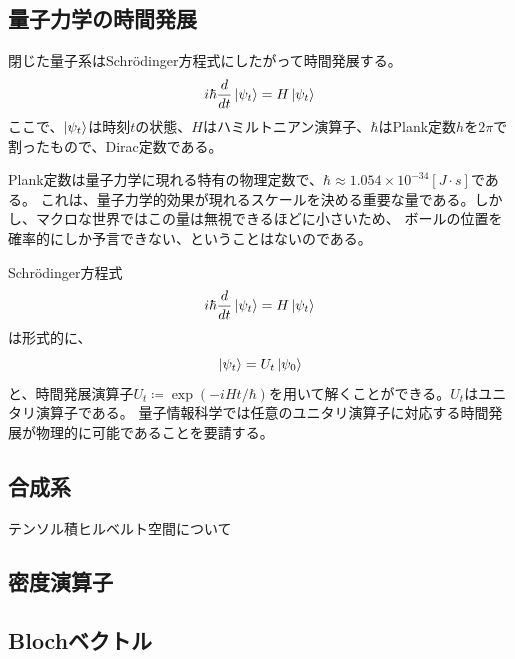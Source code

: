 \subsection{量子力学の時間発展}
\begin{Axiom}
  閉じた量子系はSchr\"{o}dinger方程式にしたがって時間発展する。
  $$
  i\hbar\frac{d}{dt}\ket{\psi_t} = H\ket{\psi_t}
  $$
  ここで、$\ket{\psi_t}$は時刻$t$の状態、$H$はハミルトニアン演算子、$\hbar$はPlank定数$h$を$2\pi$で割ったもので、Dirac定数である。
\end{Axiom}
Plank定数は量子力学に現れる特有の物理定数で、$\hbar\approx 1.054 \times 10^{-34} [J \cdot s]$である。
これは、量子力学的効果が現れるスケールを決める重要な量である。しかし、マクロな世界ではこの量は無視できるほどに小さいため、
ボールの位置を確率的にしか予言できない、ということはないのである。

Schr\"{o}dinger方程式
\begin{equation}
  i\hbar\frac{d}{dt}\ket{\psi_t} = H\ket{\psi_t}
\end{equation}
は形式的に、
\begin{equation}
  \ket{\psi_t} = U_t \ket{\psi_0}
\end{equation}
と、時間発展演算子$U_t\coloneqq \exp(-iHt/\hbar)$を用いて解くことができる。$U_t$はユニタリ演算子である。
量子情報科学では任意のユニタリ演算子に対応する時間発展が物理的に可能であることを要請する。

\subsection{合成系}
\begin{Memo}
  テンソル積ヒルベルト空間について
\end{Memo}

\subsection{密度演算子}

\subsection{Blochベクトル}


